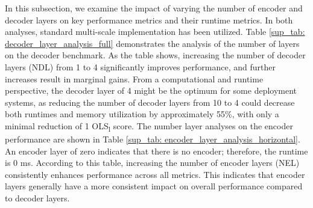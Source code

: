 \begin{table}[t]
\centering
\caption{Decoder layer analysis: OLS\textsubscript{l} scores, runtimes, and computational metrics for different decoder depths. NDL indicates the number of decoder layers.}
\label{sup_tab: decoder_layer_analysis_full}
\end{table}

\begin{table}[t]
\centering
\caption{Encoder layer analysis: OLS\textsubscript{l} scores and Torch runtimes for different encoder depths. NEL indicates the number of encoder layers. }
\label{sup_tab: encoder_layer_analysis_horizontal}
\end{table}


In this subsection, we examine the impact of varying the number of encoder and decoder layers on key performance metrics and their runtime metrics. In both analyses, standard multi-scale implementation has been utilized. Table \ref{sup_tab: decoder_layer_analysis_full} demonstrates the analysis of the number of layers on the decoder benchmark. As the table shows, increasing the number of decoder layers (NDL) from 1 to 4 significantly improves performance, and further increases result in marginal gains. From a computational and runtime perspective, the decoder layer of 4 might be the optimum for some deployment systems, as reducing the number of decoder layers from 10 to 4 could decrease both runtimes and memory utilization by approximately 55\%, with only a minimal reduction of 1 OLS\textsubscript{l} score. The number layer analyses on the encoder performance are shown in Table \ref{sup_tab: encoder_layer_analysis_horizontal}. An encoder layer of zero indicates that there is no encoder; therefore, the runtime is 0 ms. According to this table, increasing the number of encoder layers (NEL) consistently enhances performance across all metrics. This indicates that encoder layers generally have a more consistent impact on overall performance compared to decoder layers.

